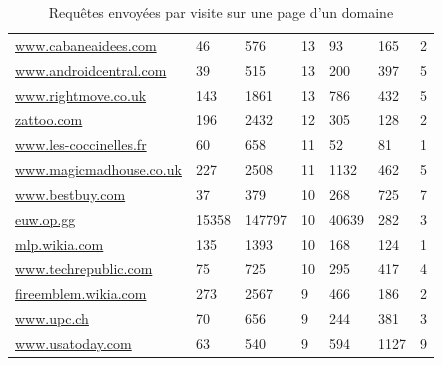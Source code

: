 \begin{table}[]
\begin{tabular}{lllllll}
\scriptsize \url{www.cabaneaidees.com}       & 46                    & 576           & 13                   & 93                       & 165          & 2              \\
\scriptsize \url{www.androidcentral.com}     & 39                    & 515           & 13                   & 200                      & 397          & 5              \\
\scriptsize \url{www.rightmove.co.uk}        & 143                   & 1861          & 13                   & 786                      & 432          & 5              \\
\scriptsize \url{zattoo.com}                 & 196                   & 2432          & 12                   & 305                      & 128          & 2              \\
\scriptsize \url{www.les-coccinelles.fr}     & 60                    & 658           & 11                   & 52                       & 81           & 1              \\
\scriptsize \url{www.magicmadhouse.co.uk}    & 227                   & 2508          & 11                   & 1132                     & 462          & 5              \\
\scriptsize \url{www.bestbuy.com}            & 37                    & 379           & 10                   & 268                      & 725          & 7              \\
\scriptsize \url{euw.op.gg}                  & 15358                 & 147797        & 10                   & 40639                    & 282          & 3              \\
\scriptsize \url{mlp.wikia.com}              & 135                   & 1393          & 10                   & 168                      & 124          & 1              \\
\scriptsize \url{www.techrepublic.com}       & 75                    & 725           & 10                   & 295                      & 417          & 4              \\
\scriptsize \url{fireemblem.wikia.com}       & 273                   & 2567          & 9                    & 466                      & 186          & 2              \\
\scriptsize \url{www.upc.ch}                 & 70                    & 656           & 9                    & 244                      & 381          & 3              \\
\scriptsize \url{www.usatoday.com}           & 63                    & 540           & 9                    & 594                      & 1127         & 9              \\       
\end{tabular}
\caption{Requêtes envoyées par visite sur une page d'un domaine}
\label{trackers-2}
\end{table}

